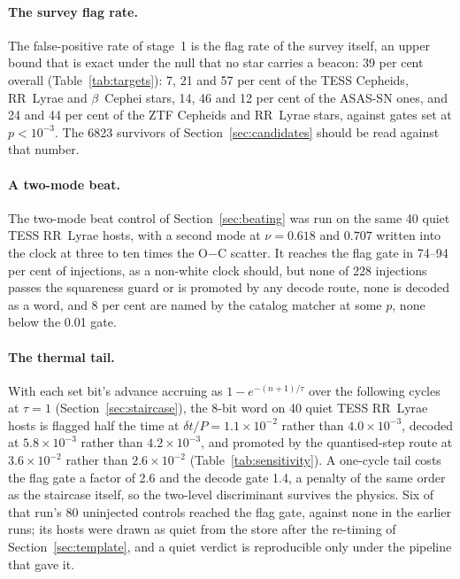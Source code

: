 \documentclass[final,5p]{elsarticle}
\newcommand{\oc}{O$-$C}
\newcommand{\dtp}{\ensuremath{\delta t/P}}
\newcommand{\bcep}{\ensuremath{\beta}~Cephei}
\begin{document}
\paragraph{The survey flag rate.}
The false-positive rate of stage~1 is the flag rate of the survey itself, an upper bound that is exact under the null that no star carries a beacon: 39 per cent overall (Table~\ref{tab:targets}): 7, 21 and 57 per cent of the TESS Cepheids, RR~Lyrae and \bcep{} stars, 14, 46 and 12 per cent of the ASAS-SN ones, and 24 and 44 per cent of the ZTF Cepheids and RR~Lyrae stars, against gates set at $p<10^{-3}$. The 6823 survivors of Section~\ref{sec:candidates} should be read against that number.

\paragraph{A two-mode beat.}
The two-mode beat control of Section~\ref{sec:beating} was run on the same 40 quiet TESS RR~Lyrae hosts, with a second mode at $\nu=0.618$ and $0.707$ written into the clock at three to ten times the \oc{} scatter. It reaches the flag gate in 74--94 per cent of injections, as a non-white clock should, but none of 228 injections passes the squareness guard or is promoted by any decode route, none is decoded as a word, and 8 per cent are named by the catalog matcher at some $p$, none below the 0.01 gate.

\paragraph{The thermal tail.}
With each set bit's advance accruing as $1-e^{-(n+1)/\tau}$ over the following cycles at $\tau=1$ (Section~\ref{sec:staircase}), the 8-bit word on 40 quiet TESS RR~Lyrae hosts is flagged half the time at $\dtp=1.1\times10^{-2}$ rather than $4.0\times10^{-3}$, decoded at $5.8\times10^{-3}$ rather than $4.2\times10^{-3}$, and promoted by the quantised-step route at $3.6\times10^{-2}$ rather than $2.6\times10^{-2}$ (Table~\ref{tab:sensitivity}). A one-cycle tail costs the flag gate a factor of 2.6 and the decode gate 1.4, a penalty of the same order as the staircase itself, so the two-level discriminant survives the physics. Six of that run's 80 uninjected controls reached the flag gate, against none in the earlier runs; its hosts were drawn as quiet from the store after the re-timing of Section~\ref{sec:template}, and a quiet verdict is reproducible only under the pipeline that gave it.
\end{document}
